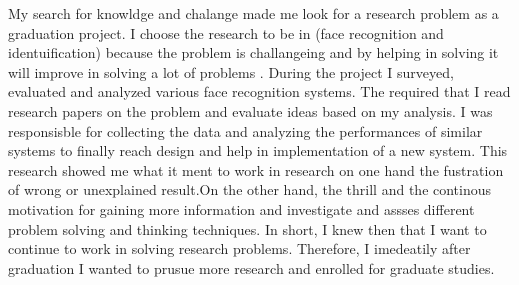 \documentclass[a4paper,12pt]{article}%
\begin{document}
  My search for knowldge and chalange made me look for a research problem as a graduation project. I choose the research to be in (face recognition and identuification) because the problem is challangeing and by helping in solving it will improve in solving a lot of problems . During the project I  surveyed, evaluated and analyzed various face recognition systems. The required that I read research papers on the problem and evaluate ideas based on my analysis. I was responsisble for collecting the data and analyzing the performances of similar systems to finally reach design and help in implementation of a new system. This research showed me what it ment to work in research on one hand the fustration of wrong or unexplained result.On the other hand, the thrill and the continous motivation for gaining more information and investigate and assses different problem solving and thinking techniques. In short, I knew then that I want to continue to work in solving research problems. Therefore, I imedeatily after graduation I wanted to prusue more research and enrolled for graduate studies. %
 
\end{document}
